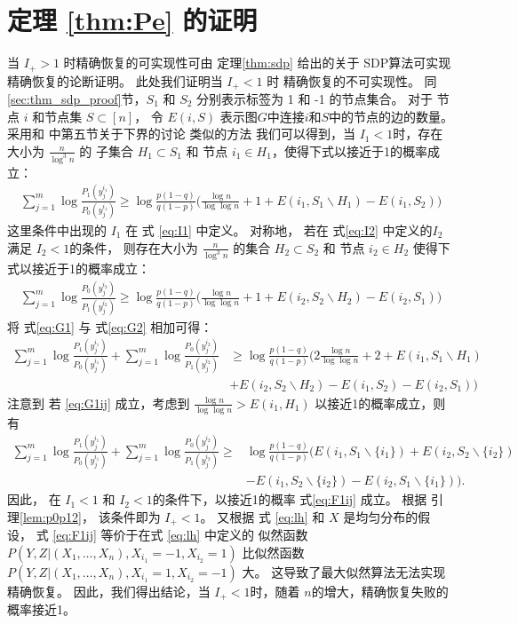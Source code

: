 \section{定理 \ref{thm:Pe} 的证明}
当 $I_+ > 1$ 时精确恢复的可实现性可由 定理\ref{thm:sdp} 给出的关于 SDP算法可实现精确恢复的论断证明。
此处我们证明当 $I_+ < 1$ 时  %
精确恢复的不可实现性。
同\ref{sec:thm_sdp_proof}节，$S_1$ 和 $S_2$ 分别表示标签为 1 和 -1 的节点集合。
对于 节点 $i$ 和节点集 $S\subset [n]$，
令 $E(i,S)$ 表示图$G$中连接$i$和$S$中的节点的边的数量。
采用和 \cite{abbe2015exact} 中第五节关于下界的讨论 类似的方法
我们可以得到，当 $I_1<1$时，存在大小为 $\frac{n}{\log^3 n}$  的 子集合
    $H_1\subset S_1$ 和 节点 $i_1\in H_1$，使得下式以接近于1的概率成立：
\begin{align}
    \sum_{j=1}^{m} \log \frac{P_1(y^{i_1}_{j})}{P_0(y^{i_1}_{j})}
    \ge \log \frac{p(1-q)}{q(1-p)}\Big(\frac{\log n}{\log\log n}+1
    +E(i_1, S_1 \backslash H_1) - E(i_1, S_2) \Big) \label{eq:G1}
\end{align}
这里条件中出现的 $I_1$ 在 式 \eqref{eq:I1} 中定义。
对称地， 若在 式\eqref{eq:I2} 中定义的$I_2$满足  $I_2<1$的条件，
则存在大小为 $\frac{n}{\log^3 n}$  的集合
    $H_2\subset S_2$ 和 节点 $i_2\in H_2$ 使得下式以接近于1的概率成立：
    \begin{align}
        \sum_{j=1}^{m} \log \frac{P_0(y^{i_2}_{j})}{P_1(y^{i_2}_{j})}
        \ge \log \frac{p(1-q)}{q(1-p)}\Big(\frac{\log n}{\log\log n}+1
        +E(i_2, S_2 \backslash H_2) - E(i_2, S_1) \Big) \label{eq:G2}
    \end{align}	
将 式\eqref{eq:G1} 与 式\eqref{eq:G2} 相加可得：
\begin{align}
    \sum_{j=1}^{m} \log \frac{P_1(y^{i_1}_{j})}{P_0(y^{i_1}_{j})}
    +\sum_{j=1}^{m} \log \frac{P_0(y^{i_2}_{j})}{P_1(y^{i_2}_{j})}
    &\ge \log \frac{p(1-q)}{q(1-p)}\Big(2\frac{\log n}{\log\log n}+2+E(i_1, S_1 \backslash H_1) \nonumber\\
    &+ E(i_2, S_2 \backslash H_2)- E(i_1, S_2 ) - E(i_2, S_1 )\Big) \label{eq:G1ij}
\end{align}	
    注意到 若 \eqref{eq:G1ij} 成立，考虑到 $\frac{\log n}{\log \log n} > E(i_1, H_1)$ 
    以接近1的概率成立，则有
\begin{align}
    \sum_{j=1}^{m} \log \frac{P_1(y^{i_1}_{j})}{P_0(y^{i_1}_{j})}
    +\sum_{j=1}^{m} \log \frac{P_0(y^{i_2}_{j})}{P_1(y^{i_2}_{j})}
    \ge &\log \frac{p(1-q)}{q(1-p)}(E(i_1, S_1 \backslash \{i_1\}) + E(i_2, S_2 \backslash \{i_2\})\nonumber\\
    &- E(i_1, S_2 \backslash \{i_2\}) - E(i_2, S_1 \backslash \{i_1\})) \label{eq:F1ij}.
\end{align}
因此， 在 $I_1<1$ 和 $I_2<1$的条件下，以接近1的概率 式\eqref{eq:F1ij} 成立。
根据 引理\ref{lem:p0p12}，
该条件即为 $I_+<1$。
又根据 式 \eqref{eq:lh} 和 $X$ 是均匀分布的假设，
式 \eqref{eq:F1ij} 等价于在式 \eqref{eq:lh} 中定义的 似然函数
$P(Y,Z|(X_1,\ldots,X_n),X_{i_1}=-1,X_{i_2}=1)$
比似然函数
$P(Y,Z|(X_1,\ldots,X_n),X_{i_1}=1,X_{i_2}=-1)$
大。
这导致了最大似然算法无法实现精确恢复。
因此，我们得出结论，当 $I_+<1$时，随着 $n$的增大，精确恢复失败的概率接近1。

